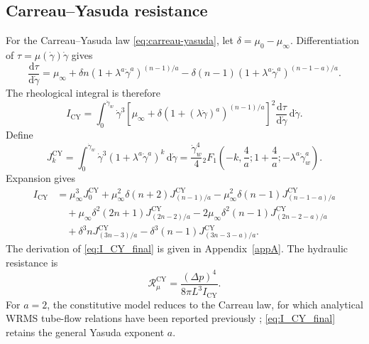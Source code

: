 \documentclass[lineno]{jfm}
\begin{document}
\subsection{Carreau--Yasuda resistance}
For the Carreau--Yasuda law \eqref{eq:carreau-yasuda}, let
$\delta=\mu_0-\mu_\infty$. Differentiation of
$\tau=\mu(\dot{\gamma})\dot{\gamma}$ gives
\begin{equation}
\frac{\mathrm{d}\tau}{\mathrm{d}\dot{\gamma}}
=
\mu_{\infty}
+
\delta n
\left(
1+\lambda^a\dot{\gamma}^a
\right)^{(n-1)/a}
-
\delta(n-1)
\left(
1+\lambda^a\dot{\gamma}^a
\right)^{(n-1-a)/a}.
\label{eq:dtau_dgamma_CY}
\end{equation}
The rheological integral is therefore
\begin{equation}
I_{\mathrm{CY}}
=
\int_0^{\dot{\gamma}_w}
\dot{\gamma}^3
\left[
\mu_{\infty}
+
\delta
\left(
1+(\lambda\dot{\gamma})^a
\right)^{(n-1)/a}
\right]^2
\frac{\mathrm{d}\tau}{\mathrm{d}\dot{\gamma}}
\,\mathrm{d}\dot{\gamma}.
\label{eq:I_CY_start}
\end{equation}
Define
\begin{equation}
J_k^{\mathrm{CY}}
=
\int_0^{\dot{\gamma}_w}
\dot{\gamma}^3
\left(
1+\lambda^a\dot{\gamma}^a
\right)^k
\,\mathrm{d}\dot{\gamma}
=
\frac{\dot{\gamma}_w^4}{4}
{}_2F_1\!\left(
-k,\frac{4}{a};
1+\frac{4}{a};
-\lambda^a\dot{\gamma}_w^a
\right).
\label{eq:Jk_CY}
\end{equation}
Expansion gives
\begin{align}
I_{\mathrm{CY}}
&=
\mu_{\infty}^3J_0^{\mathrm{CY}}
+
\mu_{\infty}^2\delta(n+2)
J_{(n-1)/a}^{\mathrm{CY}}
-
\mu_{\infty}^2\delta(n-1)
J_{(n-1-a)/a}^{\mathrm{CY}}
\nonumber\\
&\quad
+
\mu_{\infty}\delta^2(2n+1)
J_{(2n-2)/a}^{\mathrm{CY}}
-
2\mu_{\infty}\delta^2(n-1)
J_{(2n-2-a)/a}^{\mathrm{CY}}
\nonumber\\
&\quad
+
\delta^3n
J_{(3n-3)/a}^{\mathrm{CY}}
-
\delta^3(n-1)
J_{(3n-3-a)/a}^{\mathrm{CY}}.
\label{eq:I_CY_final}
\end{align}
The derivation of \eqref{eq:I_CY_final} is given in
Appendix~\ref{appA}. The hydraulic resistance is
\begin{equation}
\mathcal{R}_{\mu}^{\mathrm{CY}}
=
\frac{(\Delta p)^4}
{8\pi L^3 I_{\mathrm{CY}}}.
\label{eq:R_CY}
\end{equation}
For $a=2$, the constitutive model reduces to the Carreau law, for which
analytical WRMS tube-flow relations have been reported previously
\citep{Sochi2015}; \eqref{eq:I_CY_final} retains the general Yasuda exponent
$a$.
\end{document}
